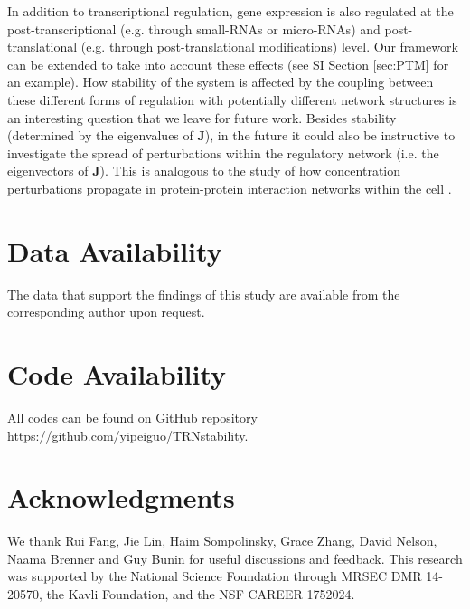 \documentclass[10pt]{article}
\begin{document}
 In addition to transcriptional regulation, gene expression is also regulated at the post-transcriptional (e.g. through small-RNAs or micro-RNAs) and post-translational (e.g. through post-translational modifications) level. Our framework can be extended to take into account these effects (see SI Section \ref{sec:PTM} for an example). How stability of the system is affected by the coupling between these different forms of regulation with potentially different network structures is an interesting question that we leave for future work. Besides stability (determined by the eigenvalues of $\mathbf{J}$), in the future it could also be instructive to investigate the spread of perturbations within the regulatory network (i.e. the eigenvectors of $\mathbf{J}$). This is analogous to the study of how concentration perturbations propagate in protein-protein interaction networks within the cell \cite{maslov2007spreading}.







\section*{Data Availability}
The data that support the findings of this study are available from the corresponding
author upon request.

\section*{Code Availability}
All codes can be found on GitHub repository https://github.com/yipeiguo/TRNstability.


% 


\section*{Acknowledgments}
We thank Rui Fang, Jie Lin, Haim Sompolinsky, Grace Zhang, David Nelson, Naama Brenner and Guy Bunin for useful discussions and feedback. This research was supported by the National Science Foundation through MRSEC DMR 14-20570, the Kavli Foundation, and the NSF CAREER 1752024. 
\end{document}

